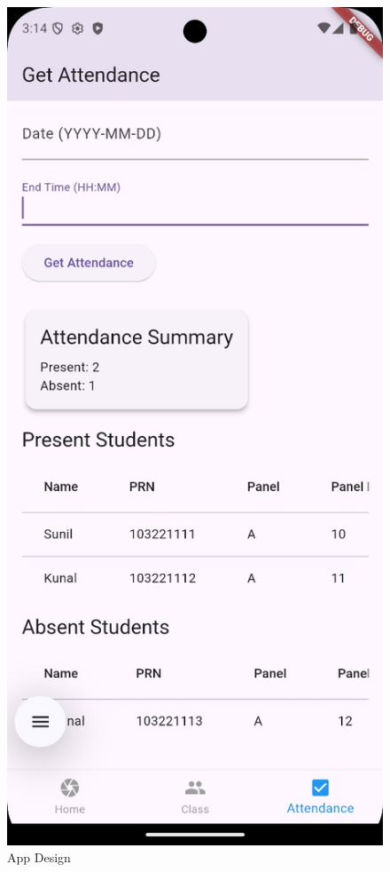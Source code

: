 \documentclass[openany]{report}
\begin{document}
\begin{figure}[H]
    \centering
    \includegraphics[width=.95\textwidth]{../imgs/app 3.jpg}
    \caption{App Design}
\end{figure}
\end{document}
